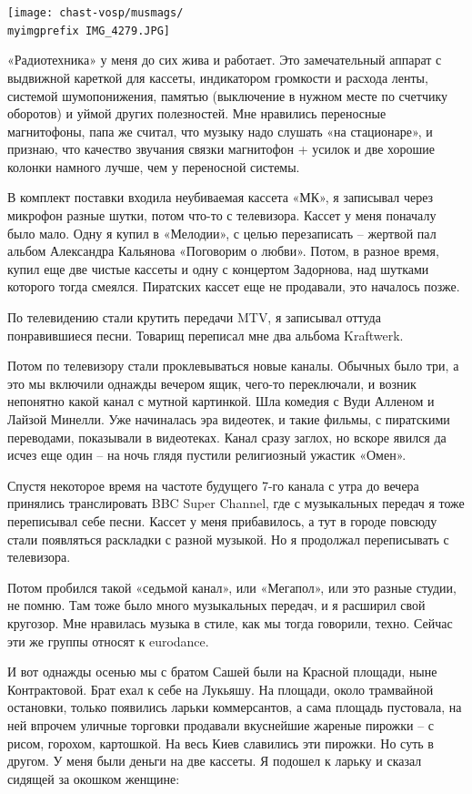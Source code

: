 \begin{center}
\texttt{[image: chast-vosp/musmags/\\myimgprefix IMG\_4279.JPG]}
\end{center}

«Радиотехника» у меня до сих жива и работает. Это замечательный аппарат с выдвижной кареткой для кассеты, индикатором громкости и расхода ленты, системой шумопонижения, памятью (выключение в нужном месте по счетчику оборотов) и уймой других полезностей. Мне нравились переносные магнитофоны, папа же считал, что музыку надо слушать «на стационаре», и признаю, что качество звучания связки магнитофон + усилок и две хорошие колонки намного лучше, чем у переносной системы.

В комплект поставки входила неубиваемая кассета «МК», я записывал через микрофон разные шутки, потом что-то с телевизора. Кассет у меня поначалу было мало. Одну я купил в «Мелодии», с целью перезаписать – жертвой пал альбом Александра Кальянова «Поговорим о любви». Потом, в разное время, купил еще две чистые кассеты и одну с концертом Задорнова, над шутками которого тогда смеялся. Пиратских кассет еще не продавали, это началось позже.

По телевидению стали крутить передачи MTV, я записывал оттуда понравившиеся песни. Товарищ переписал мне два альбома Kraftwerk. 

Потом по телевизору стали проклевываться новые каналы. Обычных было три, а это мы включили однажды вечером ящик, чего-то переключали, и возник непонятно какой канал с мутной картинкой. Шла комедия с Вуди Алленом и Лайзой Минелли. Уже начиналась эра видеотек, и такие фильмы, с пиратскими переводами, показывали в видеотеках. Канал сразу заглох, но вскоре явился да исчез еще один – на ночь глядя пустили религиозный ужастик «Омен». 

Спустя некоторое время на частоте будущего 7-го канала с утра до вечера принялись транслировать BBC Super Channel, где с музыкальных передач я тоже переписывал себе песни. Кассет у меня прибавилось, а тут в городе повсюду стали появляться раскладки с разной музыкой. Но я продолжал переписывать с телевизора.

Потом пробился такой «седьмой канал», или «Мегапол», или это разные студии, не помню. Там тоже было много музыкальных передач, и я расширил свой кругозор. Мне нравилась музыка в стиле, как мы тогда говорили, техно. Сейчас эти же группы относят к eurodance.

И вот однажды осенью мы с братом Сашей были на Красной площади, ныне Контрактовой. Брат ехал к себе на Лукьяшу. На площади, около трамвайной остановки, только появились ларьки коммерсантов, а сама площадь пустовала, на ней впрочем уличные торговки продавали вкуснейшие жареные пирожки – с рисом, горохом, картошкой. На весь Киев славились эти пирожки. Но суть в другом. У меня были деньги на две кассеты. Я подошел к ларьку и сказал сидящей за окошком женщине:

